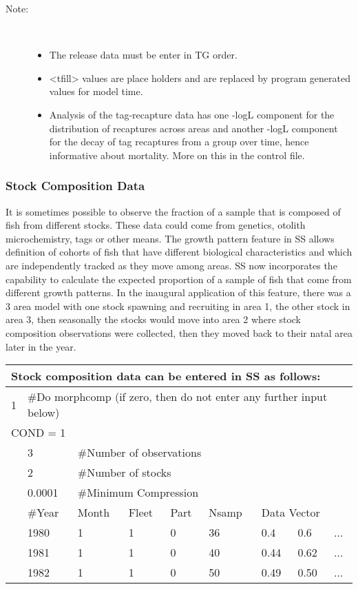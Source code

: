 \begin{description}
	\item[Note:]\
	\begin{itemize}
		\item The release data must be enter in TG order.
		\item <tfill> values are place holders and are replaced by program generated values for model time.
		\item Analysis of the tag-recapture data has one -logL component for the distribution of recaptures across areas and another -logL component for the decay of tag recaptures from a group over time, hence informative about mortality.  More on this in the control file.
	\end{itemize}
\end{description}

\subsubsection{Stock Composition Data}
It is sometimes possible to observe the fraction of a sample that is composed of fish from different stocks.  These data could come from genetics, otolith microchemistry, tags or other means.  The growth pattern feature in SS allows definition of cohorts of fish that have different biological characteristics and which are independently tracked as they move among areas.  SS now incorporates the capability to calculate the expected proportion of a sample of fish that come from different growth patterns.  In the inaugural application of this feature, there was a 3 area model with one stock spawning and recruiting in area 1, the other stock in area 3, then seasonally the stocks would move into area 2 where stock composition observations were collected, then they moved back to their natal area later in the year.

\begin{center}
	\begin{tabular}{p{1.1cm} p{1.1cm} p{1.1cm} p{1.1cm} p{1.1cm} p{1.1cm} p{1.1cm} p{1.1cm} p{3.5cm}}
		\multicolumn{9}{l}{Stock composition data can be entered in SS as follows:}\\
		\hline
		1 &  \multicolumn{8}{l}{\#Do morphcomp (if zero, then do not enter any further input below)}\\
		\hline
		\multicolumn{9}{l}{COND = 1}\\ 
		& 3 & \multicolumn{7}{l}{\#Number of observations}\\
		\hline
		& 2 & \multicolumn{7}{l}{\#Number of stocks}\\
		\hline
		& 0.0001 & \multicolumn{7}{l}{\#Minimum Compression}\\
		\hline
		& \#Year & Month & Fleet & Part & Nsamp & \multicolumn{3}{l}{Data Vector} \\
		\hline
		& 1980 & 1 & 1 & 0 & 36 & 0.4 & 0.6 & ...\\
		& 1981 & 1 & 1 & 0 & 40 & 0.44 & 0.62 & ...\\
		& 1982 & 1 & 1 & 0 & 50 & 0.49 & 0.50 & ...\\
		\hline
	\end{tabular}
\end{center}

